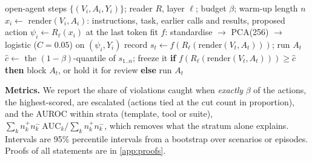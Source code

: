 \begin{algorithm}[t]
\caption{The grey-box monitor}
\label{alg:monitor}
\small
\begin{algorithmic}[1]
\REQUIRE open-agent steps $\{(V_i,A_i,Y_i)\}$; reader $R$, layer $\ell$; budget $\beta$; warm-up length $n$
\STATE $x_i\gets$ render$(V_i,A_i)$: instructions, task, earlier calls and results, proposed action
\STATE $\psi_i\gets R_\ell(x_i)$ at the last token 
\STATE fit $f$: standardise $\to$ PCA(256) $\to$ logistic ($C{=}0.05$) on $(\psi_i,Y_i)$ 
  \STATE record $s_t\gets f(R_\ell(\text{render}(V_t,A_t)))$; run $A_t$ 
\ENDFOR
\STATE $\hat c\gets$ the $(1-\beta)$-quantile of $s_{1..n}$; freeze it 
  \STATE \textbf{if} $f(R_\ell(\text{render}(V_t,A_t)))\ge\hat c$ \textbf{then} block $A_t$, or hold it for review \textbf{else} run $A_t$
\ENDFOR
\end{algorithmic}
\end{algorithm}


\textbf{Metrics.} We report the share of violations caught when \emph{exactly} $\beta$ of the actions, the highest-scored, are escalated (actions tied at the cut count in proportion), and the AUROC within strata (template, tool or suite), $\sum_k n^+_kn^-_k\,\mathrm{AUC}_k/\sum_k n^+_kn^-_k$, which removes what the stratum alone explains. Intervals are 95\% percentile intervals from a bootstrap over scenarios or episodes. Proofs of all statements are in \cref{app:proofs}.
